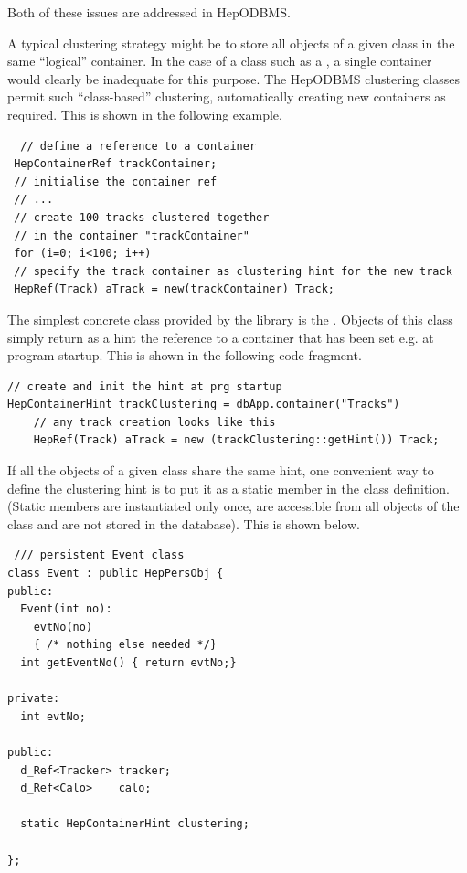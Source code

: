 \par
Both of these issues are addressed in HepODBMS.
\par
A typical clustering strategy might be to store all objects of a given class in the same ``logical''
container. In the case of a class such as a , a single container would clearly
be inadequate for this purpose. The HepODBMS clustering classes permit such ``class-based'' clustering,
automatically creating new containers as required. This is shown in the following example.

\begin{verbatim}
  // define a reference to a container 
 HepContainerRef trackContainer; 
 // initialise the container ref 
 // ... 
 // create 100 tracks clustered together 
 // in the container "trackContainer" 
 for (i=0; i<100; i++) 
 // specify the track container as clustering hint for the new track 
 HepRef(Track) aTrack = new(trackContainer) Track;

\end{verbatim}

\par

The simplest concrete class provided by the library is the . 
Objects of this class simply return as a hint the reference to a container that has been set e.g. at program startup. 
This is shown in the following code fragment.
\begin{verbatim}
// create and init the hint at prg startup 
HepContainerHint trackClustering = dbApp.container("Tracks")
    // any track creation looks like this 
    HepRef(Track) aTrack = new (trackClustering::getHint()) Track; 

\end{verbatim}

\par

If all the objects of a given class share the same hint, one convenient way to define 
the clustering hint is to put it as a static member in the class definition. 
(Static members are instantiated only once, are accessible from all objects of the class and are not stored in the database). 
This is shown below.
\begin{verbatim}
 /// persistent Event class 
class Event : public HepPersObj { 
public: 
  Event(int no): 
    evtNo(no) 
    { /* nothing else needed */} 
  int getEventNo() { return evtNo;} 

private: 
  int evtNo; 

public: 
  d_Ref<Tracker> tracker; 
  d_Ref<Calo>    calo; 

  static HepContainerHint clustering; 

};
\end{verbatim}

